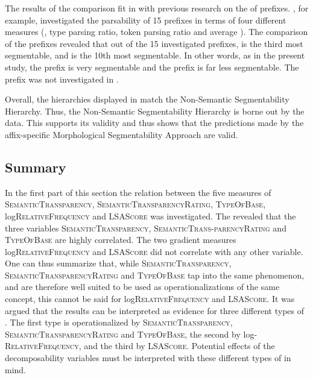 The results of the  comparison fit in with previous research on the  of prefixes. \cite{Zirkel.2010}, for example, investigated the parsability of 15 prefixes in terms of four different measures (, type parsing ratio, token parsing ratio and average ). The comparison of the prefixes revealed that out of the 15 investigated prefixes,  is the third most segmentable, and  is the 10th most segmentable. In other words, as in the present study, the prefix  is very segmentable and the prefix  is far less segmentable. The prefix  was not investigated in \cite{Zirkel.2010}. 

Overall, the  hierarchies displayed in  match the Non-Semantic Segmentability Hierarchy. Thus, the Non-Semantic Segmentability Hierarchy is borne out by the data. This supports its validity and thus shows that the predictions made by the affix-specific Morphological Segmentability Approach are valid.

\subsection{Summary } \label{summary decomposability corpus study}

In the first part of this section the relation between the five measures of  \textsc{SemanticTransparency}, \textsc{SemanticTransparencyRating}, \textsc{TypeOfBase}, log\textsc{RelativeFrequency} and \textsc{LSAScore} was investigated. The  revealed that the three variables \textsc{SemanticTransparency}, \textsc{SemanticTrans-parencyRating} and \textsc{TypeOfBase} are highly correlated. The two gradient measures  log\textsc{RelativeFrequency} and \textsc{LSAScore}  did not correlate with any other  variable.  
One can thus summarize that, while  \textsc{SemanticTransparency}, \textsc{SemanticTransparencyRating} and \textsc{TypeOfBase} tap into the same phenomenon, and are therefore well suited to be used as operationalizations of the same concept, this cannot be said for 
log\textsc{RelativeFrequency} and \textsc{LSAScore}. 
It was argued that the results can be interpreted as evidence for three different types of . The first type is operationalized by  \textsc{SemanticTransparency}, \textsc{SemanticTransparencyRating} and \textsc{TypeOfBase}, the second by log-\textsc{RelativeFrequency}, and the third by \textsc{LSAScore}. Potential effects of the decomposability variables must be interpreted with these different types of  in mind. 

